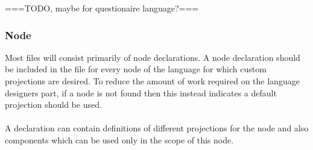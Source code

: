 \documentclass{report}
\begin{document}
===TODO, maybe for questionaire language?===

\subsubsection{Node}

Most files will consist primarily of node declarations. A node declaration should be included in the file for every node of the language for which custom projections are desired. To reduce the amount of work required on the language designers part, if a node is not found then this instead indicates a default projection should be used. 
\\
\\
A declaration can contain definitions of different projections for the node and also components which can be used only in the scope of this node.
\end{document}
